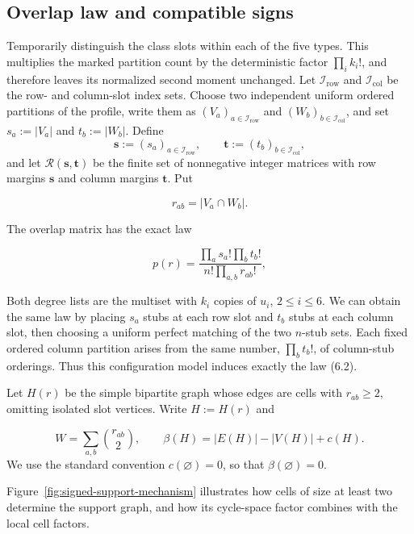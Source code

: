 \documentclass[a4paper,10pt,reqno]{amsart}
\numberwithin{equation}{section}
\theoremstyle{plain}
\theoremstyle{remark}
\begin{document}
\subsection*{Overlap law and compatible signs}

Temporarily distinguish the class slots within each of the five types.
This multiplies the marked partition count by the deterministic factor
\(\prod_i k_i!\), and therefore leaves its normalized second moment unchanged. Let $\mathcal I_{\mathrm{row}}$ and $\mathcal I_{\mathrm{col}}$ be the row- and column-slot index
sets. Choose two independent uniform ordered partitions of the profile, write
them as $(V_a)_{a\in\mathcal I_{\mathrm{row}}}$ and
$(W_b)_{b\in\mathcal I_{\mathrm{col}}}$, and set
$s_a:=|V_a|$ and $t_b:=|W_b|$. Define
\[
  \mathbf s:=(s_a)_{a\in\mathcal I_{\mathrm{row}}},
  \qquad
  \mathbf t:=(t_b)_{b\in\mathcal I_{\mathrm{col}}},
\]
and let $\mathcal R(\mathbf s,\mathbf t)$ be the finite set of nonnegative
integer matrices with row margins $\mathbf s$ and column margins $\mathbf t$.
Put

\[
 r_{ab}=|V_a\cap W_b|.                                   \tag{6.1}
\]

The overlap matrix has the exact law

\[
 p(r)=\frac{\prod_a s_a!\prod_b t_b!}
            {n!\prod_{a,b}r_{ab}!},                      \tag{6.2}
\]

Both degree lists are the multiset with $k_i$ copies of $u_i$,
$2\le i\le6$. We can obtain the same law
by placing \(s_a\) stubs at each row slot and \(t_b\) stubs at each column
slot, then choosing a uniform perfect matching of the two \(n\)-stub sets.
Each fixed ordered column partition arises from the same number,
$\prod_b t_b!$, of column-stub orderings. Thus this configuration model
induces exactly the law (6.2).

Let \(H(r)\) be the simple bipartite graph whose edges are cells
with \(r_{ab}\ge 2\), omitting isolated slot vertices.
Write $H:=H(r)$ and

\[
 W=\sum_{a,b}\binom{r_{ab}}2,\qquad
 \beta(H)=|E(H)|-|V(H)|+c(H).                             \tag{6.3}
\]
We use the standard convention \(c(\varnothing)=0\), so that
\(\beta(\varnothing)=0\).

Figure~\ref{fig:signed-support-mechanism} illustrates how cells of size
at least two determine the support graph, and how its cycle-space factor combines
with the local cell factors.
\end{document}
